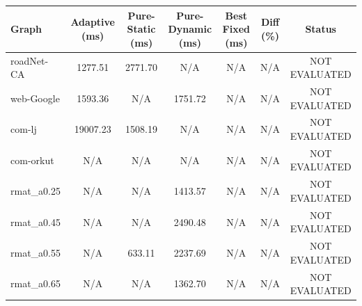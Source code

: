 \begin{tabular}{lcccccc}
\hline
Graph & Adaptive (ms) & Pure-Static (ms) & Pure-Dynamic (ms) & Best Fixed (ms) & Diff (\%) & Status \\
\hline
roadNet-CA & 1277.51 & 2771.70 & N/A & N/A & N/A & NOT EVALUATED \\
web-Google & 1593.36 & N/A & 1751.72 & N/A & N/A & NOT EVALUATED \\
com-lj & 19007.23 & 1508.19 & N/A & N/A & N/A & NOT EVALUATED \\
com-orkut & N/A & N/A & N/A & N/A & N/A & NOT EVALUATED \\
rmat_a0.25 & N/A & N/A & 1413.57 & N/A & N/A & NOT EVALUATED \\
rmat_a0.45 & N/A & N/A & 2490.48 & N/A & N/A & NOT EVALUATED \\
rmat_a0.55 & N/A & 633.11 & 2237.69 & N/A & N/A & NOT EVALUATED \\
rmat_a0.65 & N/A & N/A & 1362.70 & N/A & N/A & NOT EVALUATED \\
\hline
\end{tabular}
